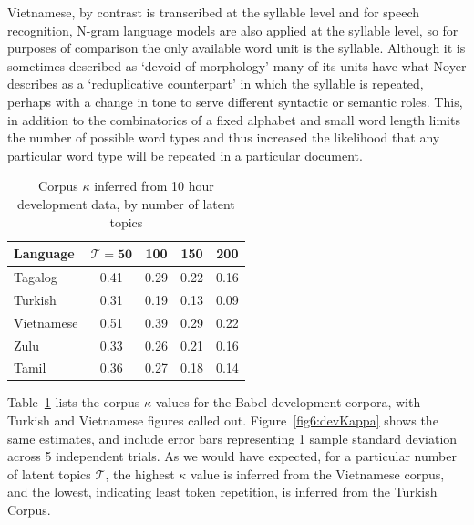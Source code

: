 Vietnamese, by contrast is transcribed at the syllable level and for speech recognition, N-gram language models are also applied at the syllable level, so for purposes of comparison the only available word unit is the syllable.  Although it is sometimes described as `devoid of morphology' \cite{noyer1998vietnamese} many of its units have what Noyer describes as a `reduplicative counterpart' in which the syllable is repeated, perhaps with a change in tone to serve different syntactic or semantic roles.  This, in addition to the combinatorics of a fixed alphabet and small word length limits the number of possible word types and thus increased the likelihood that any particular word type will be repeated in a particular document.

\begin{table}
\begin{center}
   \begin{tabular}{lcccc}
   \textbf{Language}  & $\mathbf{\mathcal{T}=50}$ & \textbf{100} & \textbf{150} & \textbf{200} \\ \midrule
     Tagalog &  0.41 & 0.29 & 0.22 & 0.16 \\
     \rowcolor{blue!5}  Turkish &  0.31 & 0.19 & 0.13 & 0.09 \\
     \rowcolor{blue!5}  Vietnamese & 0.51 & 0.39 & 0.29 & 0.22 \\
     Zulu & 0.33 & 0.26 & 0.21 & 0.16 \\
     Tamil &  0.36 & 0.27 & 0.18 & 0.14 \\ \bottomrule
        \end{tabular}
\caption[Corpus $\kappa$ inferred from development data]{Corpus $\kappa$ inferred from 10 hour development data, by number of latent topics\label{kappas}}
\end{center}
\end{table} 

Table~\ref{kappas} lists the corpus $\kappa$ values for the Babel development corpora, with Turkish and Vietnamese figures called out. Figure~\ref{fig6:devKappa} shows the same estimates, and include error bars representing 1 sample standard deviation across 5 independent trials.  As we would have expected, for a particular number of latent topics $\mathcal{T}$, the highest $\kappa$ value is inferred from the Vietnamese corpus, and the lowest, indicating least token repetition, is inferred from the Turkish Corpus.  

